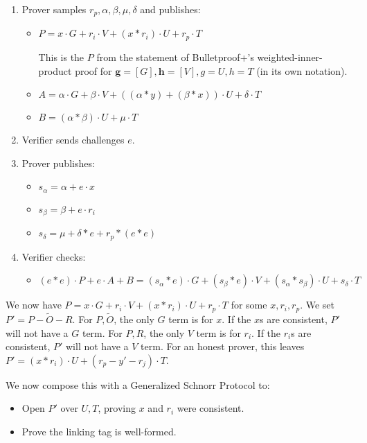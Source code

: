 \documentclass[]{article}
\begin{document}
\begin{enumerate}
	\item
	Prover samples $r_p, \alpha, \beta, \mu, \delta$ and publishes:
	\begin{itemize}
		\item
		$P = x \cdot G + r_i \cdot V + (x * r_i) \cdot U + r_p \cdot T$
		
		This is the $P$ from the statement of Bulletproof+'s weighted-inner-product proof for $\boldsymbol{g} = [G], \boldsymbol{h} = [V], g = U, h = T$ (in its own notation).
		\item
		$A = \alpha \cdot G + \beta \cdot V + ((\alpha * y) + (\beta * x)) \cdot U + \delta \cdot T$
		\item
		$B = (\alpha * \beta) \cdot U + \mu \cdot T$
	\end{itemize}
	\item
	Verifier sends challenges $e$.
	\item
	Prover publishes:
	\begin{itemize}
		\item
		$s_\alpha = \alpha + e \cdot x$	
		\item
		$s_\beta = \beta + e \cdot r_i$
		\item
		$s_\delta = \mu + \delta * e + r_p * (e * e)$
	\end{itemize}
	\item
	Verifier checks:
	\begin{itemize}
		\item
		$(e * e) \cdot P + e \cdot A + B = (s_\alpha * e) \cdot G + (s_\beta * e) \cdot V + (s_\alpha * s_\beta) \cdot U + s_\delta \cdot T$
	\end{itemize}
\end{enumerate}

We now have $P = x \cdot G + r_i \cdot V + (x * r_i) \cdot U + r_p \cdot T$ for some $x, r_i, r_p$. We set $P' = P - \tilde{O} - R$. For $P, \tilde{O}$, the only $G$ term is for $x$. If the $x$s are consistent, $P'$ will not have a $G$ term. For $P, R$, the only $V$ term is for $r_i$. If the $r_i$s are consistent, $P'$ will not have a $V$ term. For an honest prover, this leaves $P' = (x * r_i) \cdot U + (r_p - y' - r_j) \cdot T$.

We now compose this with a Generalized Schnorr Protocol to:
\begin{itemize}
	\item Open $P'$ over $U, T$, proving $x$ and $r_i$ were consistent.
	\item Prove the linking tag is well-formed.
\end{itemize}
\end{document}
